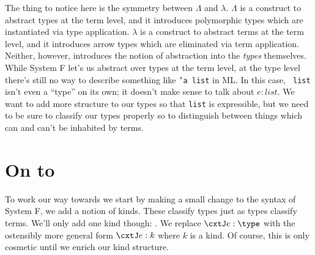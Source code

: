 \documentclass{amsart}
\begin{document}

The thing to notice here is the symmetry between $\Lambda$ and
$\lambda$. $\Lambda$ is a construct to abstract types at the term level, and it introduces polymorphic types which are instantiated via type application. $\lambda$ is a construct to abstract terms at the term level, and it introduces arrow types which are eliminated via term application. Neither, however, introduces the notion of abstraction into the \emph{types} themselves. While System F let's us abstract over types at the term level, at the type level there's still no way
to describe something like {\tt 'a list} in ML. In this case, {\tt
  list} isn't even a ``type'' on its own; it doesn't make sense to
talk about $e : list$. We want to add more structure to our types so
that {\tt list} is expressible, but we need to be sure to classify our
types properly so to distinguish between things which can and can't be
inhabited by terms.

\section{On to \Fomega}

To work our way towards \Fomega we start by making a small change
to the syntax of System F, we add a notion of kinds. These classify
types just as types classify terms. We'll only add one kind though:
\type. We replace $\cxtJ e : \type$ with the ostensibly more
general form $\cxtJ e : k$ where $k$ is a kind. Of course,
this is only cosmetic until we enrich our kind structure.
\end{document}
